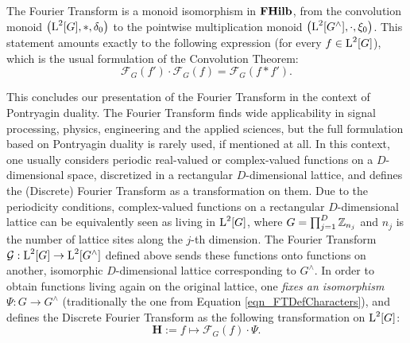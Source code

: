\begin{theorem}
The Fourier Transform is a monoid isomorphism in $\mathbf{FHilb}$, from the convolution monoid $\left( \operatorname{L}^2[G],*,\delta_0 \right)$ to the pointwise multiplication monoid $\left( \operatorname{L}^2[G^\wedge],\cdot, \xi_0 \right)$. This statement amounts exactly to the following expression (for every $f\in \operatorname{L}^2[G]$), which is the usual formulation of the Convolution Theorem: 
\begin{equation}\label{eqn_ConvolutionTheorem}
  \mathcal{F}_G (f') \cdot \mathcal{F}_G (f) = \mathcal{F}_G (f * f').
\end{equation}
\end{theorem}

This concludes our presentation of the Fourier Transform in the context of Pontryagin duality. The Fourier Transform finds wide applicability in signal processing, physics, engineering and the applied sciences, but the full formulation based on Pontryagin duality is rarely used, if mentioned at all. In this context, one usually considers periodic real-valued or complex-valued functions on a $D$-dimensional space, discretized in a rectangular $D$-dimensional lattice, and defines the (Discrete) Fourier Transform as a transformation on them. Due to the periodicity conditions, complex-valued functions on a rectangular $D$-dimensional lattice can be equivalently seen as living in $\operatorname{L}^2[G]$, where $G = \prod_{j=1}^D \mathbb{Z}_{n_j}$ and $n_j$ is the number of lattice sites along the $j$-th dimension. The  Fourier Transform $\mathcal{G} : \operatorname{L}^2[G] \rightarrow \operatorname{L}^2[G^\wedge]$ defined above sends these functions onto functions on another, isomorphic $D$-dimensional lattice corresponding to $G^\wedge$. In order to obtain functions living again on the original lattice, one \emph{fixes an isomorphism} $\Psi : G \rightarrow G^\wedge$ (traditionally the one from Equation \ref{eqn_FTDefCharacters}), and defines the Discrete Fourier Transform as the following transformation on $\operatorname{L}^2[G]$:
\begin{equation}\label{eqn_FTDefDFT}
  \mathbf{H} := f \mapsto \mathcal{F}_G(f) \cdot \Psi.
\end{equation}

